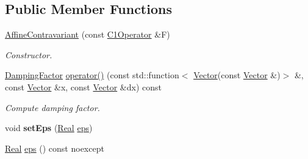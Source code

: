 \subsection*{\-Public \-Member \-Functions}
\begin{DoxyCompactItemize}
\item 
\hypertarget{classSpacy_1_1Newton_1_1Damping_1_1AffineContravariant_afbb2954f22af6d8248ec9c382a5b1ccd}{\hyperlink{classSpacy_1_1Newton_1_1Damping_1_1AffineContravariant_afbb2954f22af6d8248ec9c382a5b1ccd}{\-Affine\-Contravariant} (const \hyperlink{classSpacy_1_1C1Operator}{\-C1\-Operator} \&\-F)}\label{classSpacy_1_1Newton_1_1Damping_1_1AffineContravariant_afbb2954f22af6d8248ec9c382a5b1ccd}

\begin{DoxyCompactList}\small\item\em \-Constructor. \end{DoxyCompactList}\item 
\hypertarget{classSpacy_1_1Newton_1_1Damping_1_1AffineContravariant_a494dcf0e1c7837b4b6bd18107efcfe0b}{\hyperlink{classSpacy_1_1DampingFactor}{\-Damping\-Factor} \hyperlink{classSpacy_1_1Newton_1_1Damping_1_1AffineContravariant_a494dcf0e1c7837b4b6bd18107efcfe0b}{operator()} (const std\-::function$<$ \hyperlink{classSpacy_1_1Vector}{\-Vector}(const \hyperlink{classSpacy_1_1Vector}{\-Vector} \&)$>$ \&, const \hyperlink{classSpacy_1_1Vector}{\-Vector} \&x, const \hyperlink{classSpacy_1_1Vector}{\-Vector} \&dx) const }\label{classSpacy_1_1Newton_1_1Damping_1_1AffineContravariant_a494dcf0e1c7837b4b6bd18107efcfe0b}

\begin{DoxyCompactList}\small\item\em \-Compute damping factor. \end{DoxyCompactList}\item 
\hypertarget{classSpacy_1_1Mixin_1_1Eps_a6b4c38a60848c0ab665fb3a81e181786}{void {\bfseries set\-Eps} (\hyperlink{classSpacy_1_1Real}{\-Real} \hyperlink{classSpacy_1_1Mixin_1_1Eps_a812b99b0abc1d78a34b4114907f23f52}{eps})}\label{classSpacy_1_1Mixin_1_1Eps_a6b4c38a60848c0ab665fb3a81e181786}

\item 
\hypertarget{classSpacy_1_1Mixin_1_1Eps_a812b99b0abc1d78a34b4114907f23f52}{\hyperlink{classSpacy_1_1Real}{\-Real} \hyperlink{classSpacy_1_1Mixin_1_1Eps_a812b99b0abc1d78a34b4114907f23f52}{eps} () const noexcept}\label{classSpacy_1_1Mixin_1_1Eps_a812b99b0abc1d78a34b4114907f23f52}


\end{DoxyCompactItemize}
